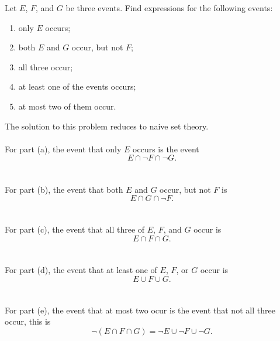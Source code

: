 \begin{problem}[Handout 1, \# 11]
  Let \(E\), \(F\), and \(G\) be three events. Find expressions for the
  following events:
  \begin{enumerate}[label=(\alph*),noitemsep]
  \item only \(E\) occurs;
  \item both \(E\) and \(G\) occur, but not \(F\);
  \item all three occur;
  \item at least one of the events occurs;
  \item at most two of them occur.
  \end{enumerate}
\end{problem}
\begin{solution*}
  The solution to this problem reduces to naive set theory.
  \\\\
  For part (a), the event that only \(E\) occurs is the event
  \[
    E\cap\lnot F\cap \lnot G.
  \]
  \\\\
  For part (b), the event that both \(E\) and \(G\) occur, but not \(F\) is
  \[
    E\cap G\cap \lnot F.
  \]
  \\\\
  For part (c), the event that all three of \(E\), \(F\), and \(G\) occur
  is
  \[
    E\cap F\cap G.
  \]
  \\\\
  For part (d), the event that at least one of \(E\), \(F\), or \(G\)
  occur is
  \[
    E\cup F\cup G.
  \]
  \\\\
  For part (e), the event that at most two ocur is the event that not all
  three occur, this is
  \[
    \lnot(E\cap F\cap G)=\lnot E\cup\lnot F\cup\lnot G.
  \]
\end{solution*}

